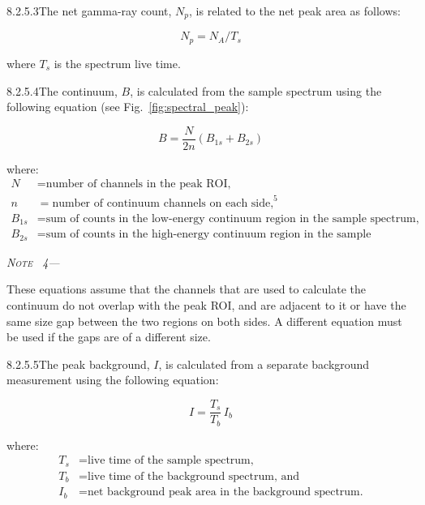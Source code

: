 \documentclass[12pt]{article}
\newenvironment{astmnote}[1][\relax]{%
  \par\smallskip\noindent\textit{N\textsc{ote}%
  \ifx#1\relax\else~#1\fi---}\ignorespaces
}{%
  \par\smallskip
}
\begin{document}
8.2.5.3\quad The net gamma-ray count, $N_p$, is related to the net peak area as follows:

\begin{equation}
  N_p = N_A / T_s
  \label{eq:net_count_rate}
\end{equation}

\noindent where $T_s$ is the spectrum live time.

8.2.5.4\quad The continuum, $B$, is calculated from the sample spectrum using the
following equation (see Fig.~\ref{fig:spectral_peak}):

\begin{equation}
  B = \frac{N}{2n}\!\left(B_{1s} + B_{2s}\right)
  \label{eq:continuum}
\end{equation}

\noindent where:
\begin{align*}
  N     &= \text{number of channels in the peak ROI,}\\
  n     &= \text{number of continuum channels on each side,}^{5}\\
  B_{1s}&= \text{sum of counts in the low-energy continuum region in the sample spectrum, and}\\
  B_{2s}&= \text{sum of counts in the high-energy continuum region in the sample spectrum.}
\end{align*}

\begin{astmnote}[4]
These equations assume that the channels that are used to calculate the continuum do not
overlap with the peak ROI, and are adjacent to it or have the same size gap between the
two regions on both sides. A different equation must be used if the gaps are of a
different size.
\end{astmnote}

8.2.5.5\quad The peak background, $I$, is calculated from a separate background
measurement using the following equation:

\begin{equation}
  I = \frac{T_s}{T_b}\,I_b
  \label{eq:peak_background}
\end{equation}

\noindent where:
\begin{align*}
  T_s &= \text{live time of the sample spectrum,}\\
  T_b &= \text{live time of the background spectrum, and}\\
  I_b &= \text{net background peak area in the background spectrum.}
\end{align*}
\end{document}
